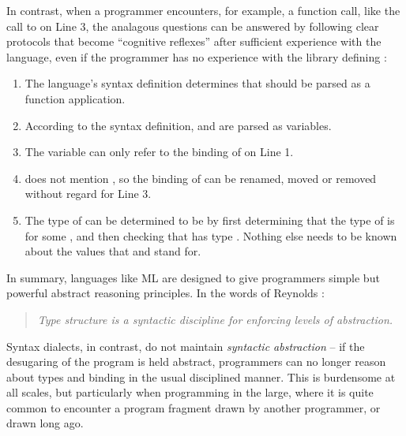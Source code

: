 In contrast, when a programmer encounters, for example, a function call, like the call to  on Line 3, the analagous questions can be answered by following clear protocols that become ``cognitive reflexes'' after sufficient experience with the language, even if the programmer has no experience with the library defining :
\begin{enumerate}
\item The language's syntax definition determines that  should be parsed as a function application.
\item According to the syntax definition,  and  are parsed as variables.
\item The variable  can only refer to the binding of  on Line 1.
\item {} does not mention , so the binding of  can be renamed, moved or removed without regard for Line 3.
\item The type of  can be determined to be  by first determining that the type of  is  for some , and then checking that  has type . Nothing else needs to be known about the values that  and  stand for. 
\end{enumerate}

In summary, languages like ML are designed to give programmers simple but powerful abstract reasoning principles. In the words of Reynolds \cite{B304}:
\begin{quote}
\emph{Type structure is a syntactic discipline for enforcing levels of abstraction.}
\end{quote}
\noindent
Syntax dialects, in contrast, do not maintain \emph{syntactic abstraction} -- if the desugaring of the program is held abstract, programmers can no longer reason about types and binding in the usual disciplined manner. This is burdensome at all scales, but particularly when programming in the large, where it is quite common to encounter a program fragment drawn by another programmer, or drawn long ago.


